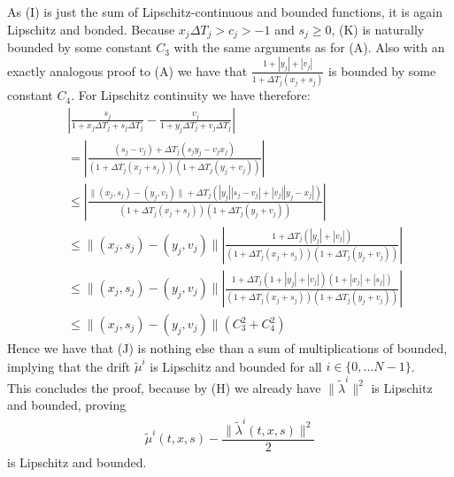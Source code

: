 \documentclass[12pt]{article}
\begin{document}
As (I) is just the sum of Lipschitz-continuous and bounded functions, it is again Lipschitz and bonded. Because $x_j\Delta T_j > c_j > -1$ and $s_j \ge 0$, (K) is naturally bounded by some constant $C_3$ with the same arguments as for (A). Also with an exactly analogous proof to (A) we have that $\frac{1 + \left|y_j\right| + \left|v_j\right|}{1 + \Delta T_j(x_j + s_j)}$ is bounded by some constant $C_4$. For Lipschitz continuity we have therefore:
\begin{align*}
	&\left|\frac{s_j}{1 + x_j\Delta T_j + s_j\Delta T_j} - \frac{v_j}{1 + y_j\Delta T_j + v_j\Delta T_j} \right|\\
	&=\left|\frac{(s_j - v_j) + \Delta T_j(s_j y_j - v_jx_j)}{\left(1 + \Delta T_j(x_j + s_j)\right)\left(1 + \Delta T_j(y_j + v_j)\right)}\right|\\
	&\le \left|\frac{\lVert (x_j,s_j) - (y_j, v_j)\rVert + \Delta T_j(\left|y_j\right| \left|s_j - v_j\right| + \left|v_j\right| \left|y_j - x_j\right|)}{\left(1 + \Delta T_j(x_j + s_j)\right)\left(1 + \Delta T_j(y_j + v_j)\right)}\right|\\
	&\le \lVert (x_j,s_j) - (y_j, v_j)\rVert\left|\frac{1 + \Delta T_j(\left|y_j\right| + \left|v_j\right|)}{\left(1 + \Delta T_j(x_j + s_j)\right)\left(1 + \Delta T_j(y_j + v_j)\right)}\right|\\
	&\le \lVert (x_j,s_j) - (y_j, v_j)\rVert\left|\frac{1 + \Delta T_j\left(1 + \left|y_j\right| + \left|v_j\right|\right)\left(1 + \left|x_j\right| + \left|s_j\right|\right)}{\left(1 + \Delta T_j(x_j + s_j)\right)\left(1 + \Delta T_j(y_j + v_j)\right)}\right|\\
	&\le \lVert (x_j,s_j) - (y_j, v_j)\rVert  \left(C_3^2 + C_4^2\right)
\end{align*}
Hence we have that (J) is nothing else than a sum of multiplications of bounded, implying that the drift $\tilde{\mu}^{i}$ is Lipschitz and bounded for all $i\in\{0,...N-1\}$.\\
This concludes the proof, because by (H) we already have $\lVert\tilde{\lambda}^{i}\rVert ^2$ is Lipschitz and bounded, proving
\begin{align*}
	\tilde{\mu}^i\left(t, x, s\right) - \dfrac{\lVert\tilde{\lambda}^{i}(t,x,s)\rVert^2}{2}
\end{align*}
is Lipschitz and bounded.
\end{document}
